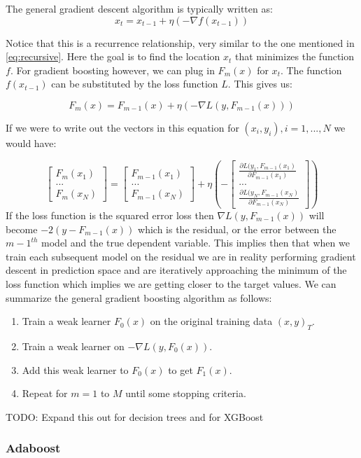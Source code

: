 The general gradient descent algorithm is typically written as:
\begin{equation}
x_t = x_{t-1} + \eta \left( -\nabla f(x_{t-1}) \right)
\end{equation}

Notice that this is a recurrence relationship, very similar to the one mentioned in \ref{eq:recursive}. Here the goal is to find the location $x_t$ that minimizes the function $f$. For gradient boosting however, we can plug in $F_m(x)$ for $x_t$. The function $f(x_{t-1})$ can be substituted by the loss function $L$. This gives us:

\begin{equation}
F_m(x) = F_{m-1}(x) + \eta \left (-\nabla L(y, F_{m-1}(x)) \right)
\end{equation}

If we were to write out the vectors in this equation for $(x_i, y_i), i=1,...,N$ we would have:

\begin{equation}
\begin{bmatrix}
F_m(x_1) \\
... \\
F_m(x_N)
\end{bmatrix} = 
\begin{bmatrix}
F_{m-1}(x_1) \\
... \\
F_{m-1}(x_N)
\end{bmatrix} + \eta \left(- 
\begin{bmatrix}
\frac{\partial L(y_1, F_{m-1}(x_1)}{\partial F_{m-1}(x_1)} \\
... \\
\frac{\partial L(y_N, F_{m-1}(x_N)}{\partial F_{m-1}(x_N)}
\end{bmatrix}
\right)
\end{equation}
If the loss function is the squared error loss then $\nabla L(y, F_{m-1}(x))$  will become $-2(y - F_{m-1}(x))$ which is the residual, or the error between the $m-1^{th}$ model and the true dependent variable. This implies then that when we train each subsequent model on the residual we are in reality performing gradient descent in prediction space and are iteratively approaching the minimum of the loss function which implies we are getting closer to the target values. We can summarize the general gradient boosting algorithm as follows:

\begin{enumerate}
\item Train a weak learner $F_0(x)$ on the original training data $(x,y)_T$.
\item Train a weak learner on $-\nabla L(y, F_{0}(x))$.
\item Add this weak learner to $F_0(x)$ to get $F_1(x)$.
\item Repeat for $m=1$ to $M$ until some stopping criteria.
\end{enumerate}

TODO: Expand this out for decision trees and for XGBoost


\subsubsection{Adaboost} \label{section:ada}